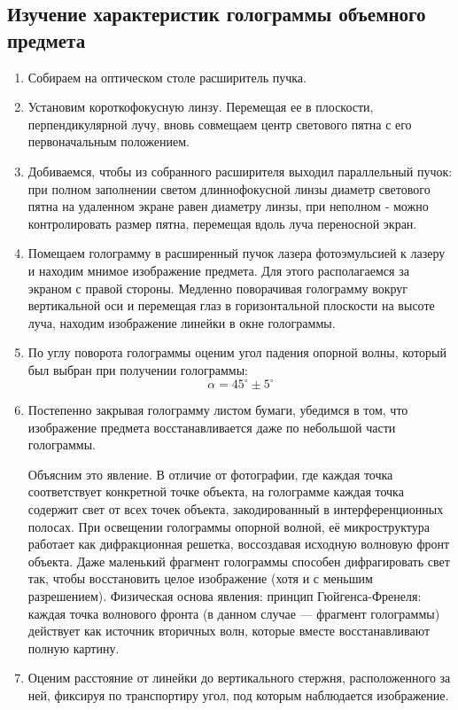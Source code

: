\documentclass[a4paper,12pt]{article}
\begin{document}
\subsection{Изучение характеристик голограммы объемного предмета}
\begin{enumerate}
    \item Собираем на оптическом столе расширитель пучка.
    \item Установим короткофокусную линзу. Перемещая ее в плоскости, перпендикулярной лучу, вновь совмещаем центр светового пятна с его первоначальным положением.
    \item Добиваемся, чтобы из собранного расширителя выходил параллельный пучок: при полном заполнении светом длиннофокусной линзы диаметр светового пятна на удаленном экране равен диаметру линзы, при неполном - можно контролировать размер пятна, перемещая вдоль луча переносной экран.
    
    \item Помещаем голограмму в расширенный пучок лазера фотоэмульсией к лазеру и находим мнимое изображение предмета. Для этого располагаемся за экраном с правой стороны. Медленно поворачивая голограмму вокруг вертикальной оси и перемещая глаз в горизонтальной плоскости на высоте луча, находим изображение линейки в окне голограммы.
    \item По углу поворота голограммы оценим угол падения опорной волны, который был выбран при получении голограммы:
    $$
    \alpha=45^\circ\pm5^\circ
    $$
    \item Постепенно закрывая голограмму листом бумаги, убедимся в том, что изображение предмета восстанавливается даже по небольшой части голограммы. 
    
    Объясним это явление. В отличие от фотографии, где каждая точка соответствует конкретной точке объекта, на голограмме каждая точка содержит свет от всех точек объекта, закодированный в интерференционных полосах. При освещении голограммы опорной волной, её микроструктура работает как дифракционная решетка, воссоздавая исходную волновую фронт объекта. Даже маленький фрагмент голограммы способен дифрагировать свет так, чтобы восстановить целое изображение (хотя и с меньшим разрешением). Физическая основа явления: принцип Гюйгенса-Френеля: каждая точка волнового фронта (в данном случае — фрагмент голограммы) действует как источник вторичных волн, которые вместе восстанавливают полную картину.
    \item Оценим расстояние от линейки до вертикального стержня, расположенного за ней, фиксируя по транспортиру угол, под которым наблюдается изображение.


\end{enumerate}
\end{document}
